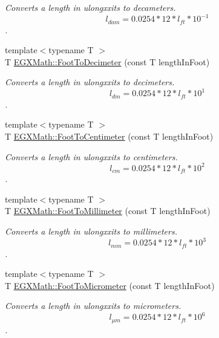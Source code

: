 \begin{DoxyCompactItemize}
\begin{DoxyCompactList}\small\item\em Converts a length in ulongxxits to decameters. \[ l_{dam}=0.0254 * 12 * l_{ft} * 10^{-1} \]. \end{DoxyCompactList}\item 
{\footnotesize template$<$typename T $>$ }\\T \mbox{\hyperlink{group___e_g_x_math-_conversions-_length_conversions-_imperial-_foot-_s_i_ga99eff28d9b367ca718238a9142b71478}{E\+G\+X\+Math\+::\+Foot\+To\+Decimeter}} (const T length\+In\+Foot)
\begin{DoxyCompactList}\small\item\em Converts a length in ulongxxits to decimeters. \[ l_{dm}=0.0254 * 12 * l_{ft} * 10^{1} \]. \end{DoxyCompactList}\item 
{\footnotesize template$<$typename T $>$ }\\T \mbox{\hyperlink{group___e_g_x_math-_conversions-_length_conversions-_imperial-_foot-_s_i_ga43e05fc21b1282adc195fe7178b2a1fc}{E\+G\+X\+Math\+::\+Foot\+To\+Centimeter}} (const T length\+In\+Foot)
\begin{DoxyCompactList}\small\item\em Converts a length in ulongxxits to centimeters. \[ l_{cm}=0.0254 * 12 * l_{ft} * 10^{2} \]. \end{DoxyCompactList}\item 
{\footnotesize template$<$typename T $>$ }\\T \mbox{\hyperlink{group___e_g_x_math-_conversions-_length_conversions-_imperial-_foot-_s_i_ga51301d8a694ede90ead086b69ba7d392}{E\+G\+X\+Math\+::\+Foot\+To\+Millimeter}} (const T length\+In\+Foot)
\begin{DoxyCompactList}\small\item\em Converts a length in ulongxxits to millimeters. \[ l_{mm}=0.0254 * 12 * l_{ft} * 10^{3} \]. \end{DoxyCompactList}\item 
{\footnotesize template$<$typename T $>$ }\\T \mbox{\hyperlink{group___e_g_x_math-_conversions-_length_conversions-_imperial-_foot-_s_i_ga2cb67daa37af94d5ddd376a4deda1b0c}{E\+G\+X\+Math\+::\+Foot\+To\+Micrometer}} (const T length\+In\+Foot)
\begin{DoxyCompactList}\small\item\em Converts a length in ulongxxits to micrometers. \[ l_{\mu m}=0.0254 * 12 * l_{ft} * 10^{6} \]. \end{DoxyCompactList}\item 

\end{DoxyCompactItemize}
